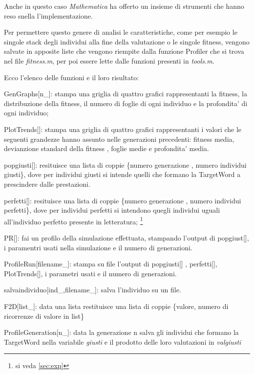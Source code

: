 \documentclass[12pt, a4paper]{article}
\begin{document}
Anche in questo caso {\itshape Mathematica} ha offerto un insieme di strumenti che hanno reso snella l'implementazione.

Per permettere questo genere di analisi le caratteristiche, come per esempio le singole stack degli individui alla fine della valutazione o le singole fitness, vengono salvate in apposite liste che vengono riempite dalla funzione Profiler che si trova nel file {\itshape fitness.m}, per poi essere lette dalle funzioni presenti in {\itshape tools.m}.

Ecco l'elenco delle funzioni e il loro risultato:
\begin{description}
\item{GenGraphs[n\_]: } stampa una griglia di quattro grafici rappresentanti la fitness, la distribuzione della fitness, il numero di foglie di ogni individuo e la profondita' di ogni individuo;
\item{PlotTrends[]: } stampa una griglia di quattro grafici rappresentanti i valori che le seguenti grandezze hanno assunto nelle generazioni precedenti: fitness media, devianzione standard della fitness , foglie medie e profondita' media.
\item{popgiusti[]: } resituisce una lista di coppie \{numero generazione , numero individui giusti\}, dove per individui giusti si intende quelli che formano la TargetWord a prescindere dalle prestazioni.
\item{perfetti[]: } resituisce una lista di coppie \{numero generazione , numero individui perfetti\}, dove per individui perfetti si intendono quegli individui uguali all'individuo perfetto presente in letteratura;
\footnote{si veda \ref{sec:exp}}
\item{PR[]: } fai un profilo della simulazione effettuata, stampando l'output di popgiust[], i paramentri usati nella simulazione e il numero di generazioni.
\item{ProfileRun[filename\_]: } stampa su file l'output di popgiusti[] , perfetti[], PlotTrends[], i parametri usati e il numero di generazioni.
\item{salvaindividuo[ind\_,filename\_]: } salva l'individuo su un file.
\item{F2D[list\_]: } data una lista restituisce una lista di coppie \{valore, numero di ricorrenze di valore in list\}
\item{ProfileGeneration[n\_]: } data la generazione n salva gli individui che formano la TargetWord nella variabile {\itshape giusti} e il prodotto delle loro valutazioni in {\itshape valgiusti}
\end{description}
\end{document}
